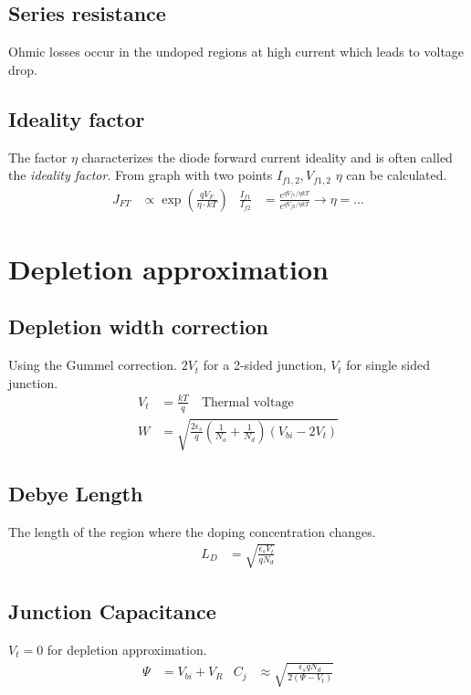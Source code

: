 \documentclass[a4paper, fontsize=8pt, landscape, DIV=1]{scrartcl}
\begin{document}
\begin{multicols*}{4}
    \subsection{Series resistance}
    Ohmic losses occur in the undoped regions at high current which leads to voltage drop.

    \subsection{Ideality factor}
    The factor $\eta$ characterizes the diode forward current ideality and is often called the \textit{ideality factor}.
    From graph with two points $I_{f1,2}, V_{f1,2}$ $\eta$ can be calculated.
    \begin{align*}
      J_{FT} &\propto \exp\left(\frac{qV_F}{\eta\cdot kT}\right) & 
      \frac{I_{f1}}{I_{f2}} &= \frac{e^{ qV_{f1}/\eta kT }} {e^{ qV_{f2}/\eta kT }} \to\eta=\dots
    \end{align*}

    \section{Depletion approximation}
    \subsection{Depletion width correction}
    Using the Gummel correction.
    $2V_t$ for a 2-sided junction, $V_t$ for single sided junction.
    \begin{align*}
      V_t &= \frac{kT}{q} \quad\text{Thermal voltage} \\
      W &= \sqrt{\frac{2\epsilon_s}{q}\left(\frac{1}{N_a} + \frac{1}{N_d}\right)(V_{bi}-2V_t)}
    \end{align*}

    \subsection{Debye Length}
    The length of the region where the doping concentration changes.
    \begin{align*}
      L_D &= \sqrt{\frac{\epsilon_sV_t}{qN_d}}
    \end{align*}

    \subsection{Junction Capacitance}
    $V_t=0$ for depletion approximation.
    \begin{align*}
      \Psi &= V_{bi} + V_R &
      C_j &\approx \sqrt{\frac{\epsilon_sqN_d}{2(\Psi - V_t)}}
    \end{align*}


\end{multicols*}
\end{document}
